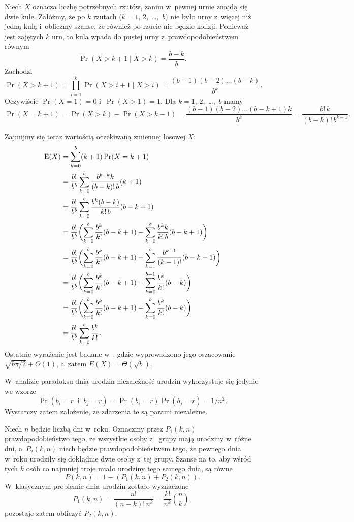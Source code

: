 \exercise %
Niech $X$ oznacza liczbę potrzebnych rzutów, zanim w~pewnej urnie znajdą się dwie kule. Załóżmy, że po $k$ rzutach ($k=1$, 2,~\dots,~$b$) nie było urny z~więcej niż jedną kulą i~obliczmy szanse, że również po  rzucie nie będzie kolizji. Ponieważ jest zajętych $k$ urn, to  kula wpada do pustej urny z~prawdopodobieństwem równym
\[
	\Pr(X>k+1\mid X>k) = \frac{b-k}{b}.
\]
Zachodzi
\[
	\Pr(X>k+1) = \prod_{i=1}^k\Pr(X>i+1\mid X>i) = \frac{(b-1)(b-2)\dots(b-k)}{b^k}.
\]
Oczywiście $\Pr(X=1)=0$ i~$\Pr(X>1)=1$. Dla $k=1$, 2,~\dots,~$b$ mamy
\[
	\Pr(X=k+1) = \Pr(X>k)-\Pr(X>k-1) = \frac{(b-1)(b-2)\dots(b-k+1)k}{b^k} = \frac{b!\,k}{(b-k)!\,b^{k+1}}.
\]

Zajmijmy się teraz wartością oczekiwaną zmiennej losowej $X$:
\begin{align*}
	\operatorname{E}(X) &= \sum_{k=0}^b(k+1)\Pr(X=k+1) \\
	&= \frac{b!}{b^b}\sum_{k=0}^b\frac{b^{b-k}k}{(b-k)!\,b}(k+1) \\
	&= \frac{b!}{b^b}\sum_{k=0}^b\frac{b^k(b-k)}{k!\,b}(b-k+1) \\
	&= \frac{b!}{b^b}\biggl(\sum_{k=0}^b\frac{b^k}{k!}(b-k+1)-\sum_{k=0}^b\frac{b^kk}{k!\,b}(b-k+1)\biggr) \\
	&= \frac{b!}{b^b}\biggl(\sum_{k=0}^b\frac{b^k}{k!}(b-k+1)-\sum_{k=1}^b\frac{b^{k-1}}{(k-1)!}(b-k+1)\biggr) \\
	&= \frac{b!}{b^b}\biggl(\sum_{k=0}^b\frac{b^k}{k!}(b-k+1)-\sum_{k=0}^{b-1}\frac{b^k}{k!}(b-k)\biggr) \\
	&= \frac{b!}{b^b}\biggl(\sum_{k=0}^b\frac{b^k}{k!}(b-k+1)-\sum_{k=0}^b\frac{b^k}{k!}(b-k)\biggr) \\
	&= \frac{b!}{b^b}\sum_{k=0}^b\frac{b^k}{k!}.
\end{align*}
Ostatnie wyrażenie jest badane w~\cite{taocp1frag}, gdzie wyprowadzono jego oszacowanie $\sqrt{b\pi/2}+O(1)$, a~zatem $E(X)=\Theta(\!\sqrt{b})$.

\exercise %
W~analizie paradoksu dnia urodzin niezależność urodzin wykorzystuje się jedynie we wzorze
\[
    \Pr(b_i=r\;\;\text{i}\;\;b_j=r) = \Pr(b_i=r)\Pr(b_j=r) = 1/n^2.
\]
Wystarczy zatem założenie, że zdarzenia te są parami niezależne.

\exercise %
Niech $n$ będzie liczbą dni w~roku. Oznaczmy przez $P_1(k,n)$ prawdopodobieństwo tego, że wszystkie osoby z~ grupy mają urodziny w~różne dni, a~$P_2(k,n)$ niech będzie prawdopodobieństwem tego, że pewnego dnia w~roku urodziły się dokładnie dwie osoby z~tej grupy. Szanse na to, aby wśród tych $k$ osób co najmniej troje miało urodziny tego samego dnia, są równe
\[
	P(k,n) = 1-(P_1(k,n)+P_2(k,n)).
\]
W~klasycznym problemie dnia urodzin zostało wyznaczone
\[
	P_1(k,n) = \frac{n!}{(n-k)!\,n^k} = \frac{k!}{n^k}\binom{n}{k},
\]
pozostaje zatem obliczyć $P_2(k,n)$.

